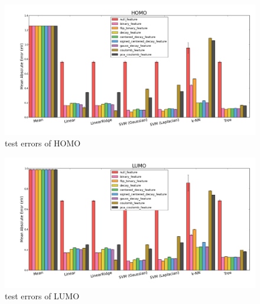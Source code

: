 \documentclass[12pt, oneside]{article}   	%
\begin{document}
\begin{figure}[H]
\begin{center}
\includegraphics [width=1\textwidth]{homo_results.png}
\caption{test errors of HOMO}\label{homo}
\end{center}
\end{figure}

\begin{figure}[H]
\begin{center}
\includegraphics [width=1\textwidth]{lumo_results.png}
\caption{test errors of LUMO}\label{lumo}
\end{center}
\end{figure}
\end{document}
